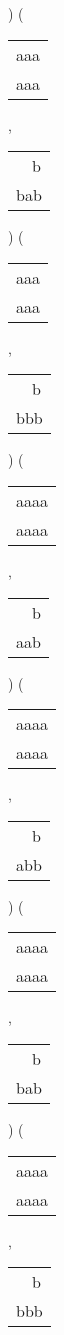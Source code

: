 ) 
 ( 
\begin{tabular}{|l|} \hline
aaa \\
aaa \\
\hline
\end{tabular} 
 , 
\begin{tabular}{|l|} \hline
\ \ b \\
bab \\
\hline
\end{tabular} 
) 
 ( 
\begin{tabular}{|l|} \hline
aaa \\
aaa \\
\hline
\end{tabular} 
 , 
\begin{tabular}{|l|} \hline
\ \ b \\
bbb \\
\hline
\end{tabular} 
) 
 ( 
\begin{tabular}{|l|} \hline
aaaa \\
aaaa \\
\hline
\end{tabular} 
 , 
\begin{tabular}{|l|} \hline
\ \ b \\
aab \\
\hline
\end{tabular} 
) 
 ( 
\begin{tabular}{|l|} \hline
aaaa \\
aaaa \\
\hline
\end{tabular} 
 , 
\begin{tabular}{|l|} \hline
\ \ b \\
abb \\
\hline
\end{tabular} 
) 
 ( 
\begin{tabular}{|l|} \hline
aaaa \\
aaaa \\
\hline
\end{tabular} 
 , 
\begin{tabular}{|l|} \hline
\ \ b \\
bab \\
\hline
\end{tabular} 
) 
 ( 
\begin{tabular}{|l|} \hline
aaaa \\
aaaa \\
\hline
\end{tabular} 
 , 
\begin{tabular}{|l|} \hline
\ \ b \\
bbb \\
\hline
\end{tabular} 
